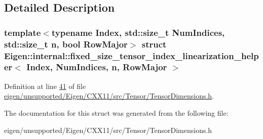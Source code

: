 \subsection{Detailed Description}
\subsubsection*{template$<$typename Index, std\+::size\+\_\+t Num\+Indices, std\+::size\+\_\+t n, bool Row\+Major$>$\newline
struct Eigen\+::internal\+::fixed\+\_\+size\+\_\+tensor\+\_\+index\+\_\+linearization\+\_\+helper$<$ Index, Num\+Indices, n, Row\+Major $>$}



Definition at line \hyperlink{eigen_2unsupported_2_eigen_2_c_x_x11_2src_2_tensor_2_tensor_dimensions_8h_source_l00041}{41} of file \hyperlink{eigen_2unsupported_2_eigen_2_c_x_x11_2src_2_tensor_2_tensor_dimensions_8h_source}{eigen/unsupported/\+Eigen/\+C\+X\+X11/src/\+Tensor/\+Tensor\+Dimensions.\+h}.



The documentation for this struct was generated from the following file\+:\begin{DoxyCompactItemize}
\item 
eigen/unsupported/\+Eigen/\+C\+X\+X11/src/\+Tensor/\+Tensor\+Dimensions.\+h\end{DoxyCompactItemize}
